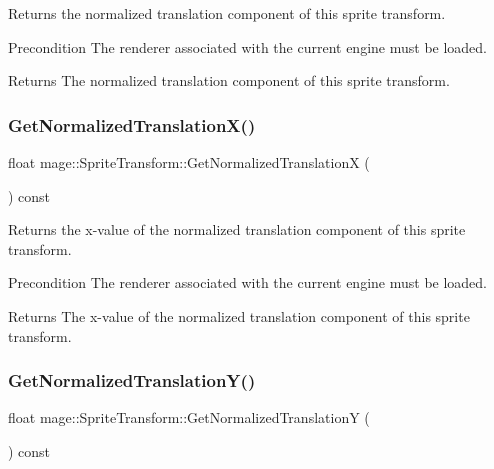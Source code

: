 Returns the normalized translation component of this sprite transform.

\begin{DoxyPrecond}{Precondition}
The renderer associated with the current engine must be loaded. 
\end{DoxyPrecond}
\begin{DoxyReturn}{Returns}
The normalized translation component of this sprite transform. 
\end{DoxyReturn}
\hypertarget{structmage_1_1_sprite_transform_a3fa25fbd159023a4329790d69d679f1e}{}\label{structmage_1_1_sprite_transform_a3fa25fbd159023a4329790d69d679f1e} 
\subsubsection{\texorpdfstring{Get\+Normalized\+Translation\+X()}{GetNormalizedTranslationX()}}
{\footnotesize\ttfamily float mage\+::\+Sprite\+Transform\+::\+Get\+Normalized\+TranslationX (\begin{DoxyParamCaption}{ }\end{DoxyParamCaption}) const}

Returns the x-\/value of the normalized translation component of this sprite transform.

\begin{DoxyPrecond}{Precondition}
The renderer associated with the current engine must be loaded. 
\end{DoxyPrecond}
\begin{DoxyReturn}{Returns}
The x-\/value of the normalized translation component of this sprite transform. 
\end{DoxyReturn}
\hypertarget{structmage_1_1_sprite_transform_ab44870b6b7ccf7de347fd4bc82fb65ae}{}\label{structmage_1_1_sprite_transform_ab44870b6b7ccf7de347fd4bc82fb65ae} 
\subsubsection{\texorpdfstring{Get\+Normalized\+Translation\+Y()}{GetNormalizedTranslationY()}}
{\footnotesize\ttfamily float mage\+::\+Sprite\+Transform\+::\+Get\+Normalized\+TranslationY (\begin{DoxyParamCaption}{ }\end{DoxyParamCaption}) const}

